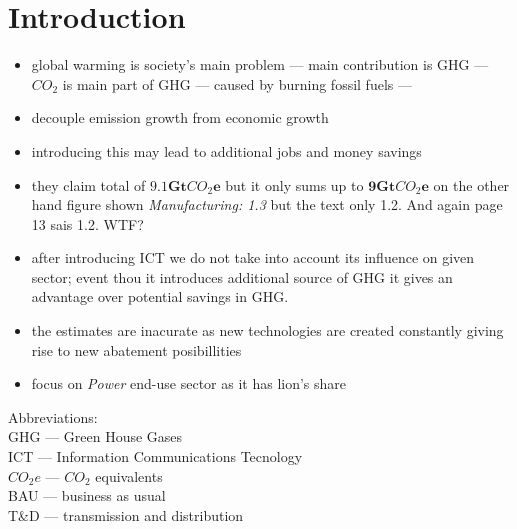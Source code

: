 \documentclass[11pt, twocolumn]{article}
\begin{document}
\section{Introduction}
\begin{itemize}
\item global warming is society's main problem --- main contribution is GHG --- $CO_2$ is main part of GHG --- caused by burning fossil fuels ---

\item decouple emission growth from economic growth

\item introducing this may lead to additional jobs and money savings

\item they claim total of $\mathbf{9.1} \mathbf{Gt}CO_2\mathbf{e}$ but it only sums up to $\mathbf{9} \mathbf{Gt}CO_2\mathbf{e}$ on the other hand figure shown \emph{Manufacturing: 1.3} but the text only 1.2. And again page 13 sais 1.2. WTF?

\item after introducing ICT we do not take into account its influence on given sector; event thou it introduces additional source of GHG it gives an advantage over potential savings in GHG.

\item the estimates are inacurate as new technologies are created constantly giving rise to new abatement posibillities

\item focus on \emph{Power} end-use sector as it has lion's share
\end{itemize}

{\small
Abbreviations:\\
GHG --- Green House Gases\\
ICT --- Information Communications Tecnology\\
$CO_2e$ --- $CO_2$ equivalents\\
BAU --- business as usual\\
T\&D --- transmission and distribution
}
\end{document}
